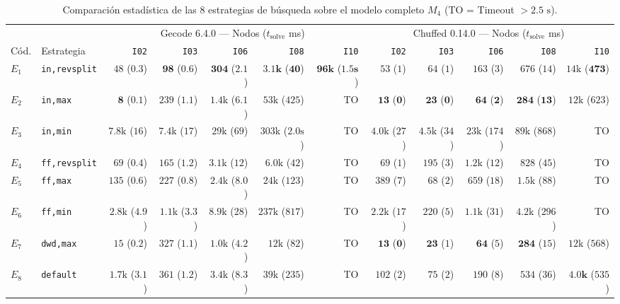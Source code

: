 \begin{table}[htbp]
    \centering
    \scriptsize
    \setlength{\tabcolsep}{0.9pt}
    \caption{Comparación estadística de las 8 estrategias de búsqueda sobre el modelo completo $M_4$ (TO = Timeout $> 2.5\text{ s}$).}
    \label{tab:estrategias_cop}
    \begin{tabular}{llrrrrrrrrrr}
        \toprule
        & & \multicolumn{5}{c}{Gecode 6.4.0 — Nodos ($t_{\text{solve}}$ ms)} & \multicolumn{5}{c}{Chuffed 0.14.0 — Nodos ($t_{\text{solve}}$ ms)} \\
        \cmidrule(lr){3-7} \cmidrule(lr){8-12}
        Cód. & Estrategia & \texttt{I02} & \texttt{I03} & \texttt{I06} & \texttt{I08} & \texttt{I10} & \texttt{I02} & \texttt{I03} & \texttt{I06} & \texttt{I08} & \texttt{I10} \\
        \midrule
        $E_1$ & \texttt{in,revsplit} & $48$ ($0.3$) & $\mathbf{98}$ ($\mathbf{0.6}$) & $\mathbf{304}$ ($\mathbf{2.1}$) & $\mathbf{3.1\text{k}}$ ($\mathbf{40}$) & $\mathbf{96\text{k}}$ ($\mathbf{1.5\text{s}}$) & $53$ ($1$) & $64$ ($1$) & $163$ ($3$) & $676$ ($14$) & $14\text{k}$ ($\mathbf{473}$) \\
        $E_2$ & \texttt{in,max}      & $\mathbf{8}$ ($\mathbf{0.1}$) & $239$ ($1.1$) & $1.4\text{k}$ ($6.1$) & $53\text{k}$ ($425$) & TO & $\mathbf{13}$ ($\mathbf{0}$) & $\mathbf{23}$ ($\mathbf{0}$) & $\mathbf{64}$ ($\mathbf{2}$) & $\mathbf{284}$ ($\mathbf{13}$) & $12\text{k}$ ($623$) \\
        $E_3$ & \texttt{in,min}      & $7.8\text{k}$ ($16$) & $7.4\text{k}$ ($17$) & $29\text{k}$ ($69$) & $303\text{k}$ ($2.0\text{s}$) & TO & $4.0\text{k}$ ($27$) & $4.5\text{k}$ ($34$) & $23\text{k}$ ($174$) & $89\text{k}$ ($868$) & TO \\
        $E_4$ & \texttt{ff,revsplit} & $69$ ($0.4$) & $165$ ($1.2$) & $3.1\text{k}$ ($12$) & $6.0\text{k}$ ($42$) & TO & $69$ ($1$) & $195$ ($3$) & $1.2\text{k}$ ($12$) & $828$ ($45$) & TO \\
        $E_5$ & \texttt{ff,max}      & $135$ ($0.6$) & $227$ ($0.8$) & $2.4\text{k}$ ($8.0$) & $24\text{k}$ ($123$) & TO & $389$ ($7$) & $68$ ($2$) & $659$ ($18$) & $1.5\text{k}$ ($88$) & TO \\
        $E_6$ & \texttt{ff,min}      & $2.8\text{k}$ ($4.9$) & $1.1\text{k}$ ($3.3$) & $8.9\text{k}$ ($28$) & $237\text{k}$ ($817$) & TO & $2.2\text{k}$ ($17$) & $220$ ($5$) & $1.1\text{k}$ ($31$) & $4.2\text{k}$ ($296$) & TO \\
        $E_7$ & \texttt{dwd,max}     & $15$ ($0.2$) & $327$ ($1.1$) & $1.0\text{k}$ ($4.2$) & $12\text{k}$ ($82$) & TO & $\mathbf{13}$ ($\mathbf{0}$) & $\mathbf{23}$ ($1$) & $\mathbf{64}$ ($5$) & $\mathbf{284}$ ($15$) & $12\text{k}$ ($568$) \\
        $E_8$ & \texttt{default}     & $1.7\text{k}$ ($3.1$) & $361$ ($1.2$) & $3.4\text{k}$ ($8.3$) & $39\text{k}$ ($235$) & TO & $102$ ($2$) & $75$ ($2$) & $190$ ($8$) & $534$ ($36$) & $\mathbf{4.0\text{k}}$ ($535$) \\
        \bottomrule
    \end{tabular}
\end{table}

